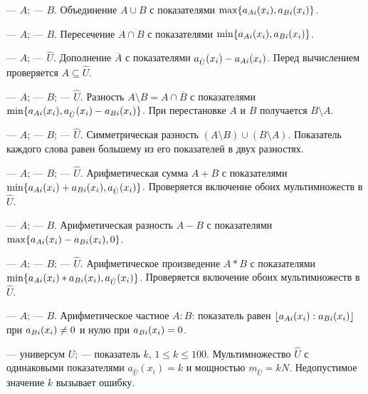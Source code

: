 { — $A$;  — $B$.}
{Объединение $A\cup B$ с показателями $\max\{a_{Ai}(x_i),a_{Bi}(x_i)\}$.}

{ — $A$;  — $B$.}
{Пересечение $A\cap B$ с показателями $\min\{a_{Ai}(x_i),a_{Bi}(x_i)\}$.}

{ — $A$;  — $\hat U$.}
{Дополнение $\overline A$ с показателями $a_{\hat{U}}(x_i)-a_{Ai}(x_i)$. Перед вычислением проверяется $A\subseteq\hat U$.}

{ — $A$;  — $B$;  — $\hat U$.}
{Разность $A\setminus B=A\cap\overline B$ с показателями $\min\{a_{Ai}(x_i),a_{\hat{U}}(x_i)-a_{Bi}(x_i)\}$. При перестановке $A$ и $B$ получается $B\setminus A$.}

{ — $A$;  — $B$;  — $\hat U$.}
{Симметрическая разность $(A\setminus B)\cup(B\setminus A)$. Показатель каждого слова равен большему из его показателей в двух разностях.}

{ — $A$;  — $B$;  — $\hat U$.}
{Арифметическая сумма $A+B$ с показателями $\min\{a_{Ai}(x_i)+a_{Bi}(x_i),a_{\hat{U}}(x_i)\}$. Проверяется включение обоих мультимножеств в $\hat U$.}

{ — $A$;  — $B$.}
{Арифметическая разность $A-B$ с показателями $\max\{a_{Ai}(x_i)-a_{Bi}(x_i),0\}$.}

{ — $A$;  — $B$;  — $\hat U$.}
{Арифметическое произведение $A*B$ с показателями $\min\{a_{Ai}(x_i)*a_{Bi}(x_i),a_{\hat{U}}(x_i)\}$. Проверяется включение обоих мультимножеств в $\hat U$.}

{ — $A$;  — $B$.}
{Арифметическое частное $A:B$: показатель равен $\lfloor a_{Ai}(x_i):a_{Bi}(x_i)\rfloor$ при $a_{Bi}(x_i)\ne0$ и нулю при $a_{Bi}(x_i)=0$.}

{ — универсум $U$;  — показатель $k$, $1\le k\le100$.}
{Мультимножество $\hat U$ с одинаковыми показателями $a_{\hat U}(x_i)=k$ и мощностью $m_{\hat U}=kN$. Недопустимое значение $k$ вызывает ошибку.}

